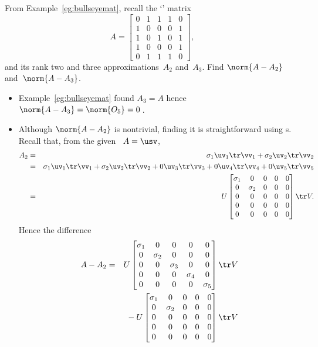 \begin{example} \label{eg:}
From Example~\ref{eg:bullseyemat}, recall the `' matrix
\begin{equation*}
A=\begin{bmatrix} 0&1&1&1&0
\\1&0&0&0&1
\\1&0&1&0&1
\\1&0&0&0&1
\\0&1&1&1&0 \end{bmatrix},
\end{equation*}
and its rank two and three approximations~\(A_2\) and~\(A_3\).
Find \(\norm{A-A_2}\) and~\(\norm{A-A_3}\).
\begin{solution} 
\begin{itemize}
\item Example~\ref{eg:bullseyemat} found \(A_3=A\) hence \(\norm{A-A_3}=\norm{O_5}=0\)\,.
\item Although \(\norm{A-A_2}\) is nontrivial, finding it is straightforward using \svd{}s.
Recall that, from the given \svd\ \(A=\usv\),
\begin{eqnarray*}
A_2&=&\sigma_1\uv_1\tr\vv_1+\sigma_2\uv_2\tr\vv_2
\\&=&\sigma_1\uv_1\tr\vv_1+\sigma_2\uv_2\tr\vv_2+0\uv_3\tr\vv_3+0\uv_4\tr\vv_4+0\uv_5\tr\vv_5
\\&=&U\begin{bmatrix} \sigma_1&0&0&0&0
\\0&\sigma_2&0&0&0
\\0&0&0&0&0
\\0&0&0&0&0
\\0&0&0&0&0 \end{bmatrix}\tr V.
\end{eqnarray*}
Hence the difference
\begin{eqnarray*}
A-A_2&=&U\begin{bmatrix} \sigma_1&0&0&0&0
\\0&\sigma_2&0&0&0
\\0&0&\sigma_3&0&0
\\0&0&0&\sigma_4&0
\\0&0&0&0&\sigma_5 \end{bmatrix}\tr V
\\&&{}
-U\begin{bmatrix} \sigma_1&0&0&0&0
\\0&\sigma_2&0&0&0
\\0&0&0&0&0
\\0&0&0&0&0
\\0&0&0&0&0 \end{bmatrix}\tr V

\end{eqnarray*}
\end{itemize}
\end{solution}
\end{example}
